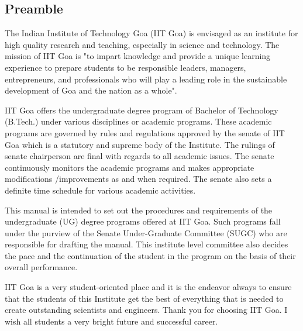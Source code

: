 \begin{center}
    \section*{Preamble }
\end{center}
The Indian Institute of Technology Goa (IIT Goa) is envisaged as an institute for high quality research and teaching, especially in science and technology. The mission of IIT Goa is "to impart knowledge and provide a unique learning experience to prepare students to be responsible leaders, managers, entrepreneurs, and professionals who will play a leading role in the sustainable development of Goa and the nation as a whole".

IIT Goa offers the undergraduate degree program of Bachelor of Technology (B.Tech.) under various disciplines or academic programs. These academic programs are governed by rules and regulations approved by the senate of IIT Goa which is a statutory and supreme body of the Institute. The rulings of senate chairperson are final with regards to all academic issues. The senate continuously monitors the academic programs and makes appropriate modifications /improvements as and when required. The senate also sets a definite time schedule for various academic activities. 

This manual is intended to set out the procedures and requirements of the undergraduate (UG) degree programs offered at IIT Goa. Such programs fall under the purview of the Senate Under-Graduate Committee (SUGC) who are responsible for drafting the manual. This institute level committee also decides the pace and the continuation of the student in the program on the basis of their overall performance.

IIT Goa is a very student-oriented place and it is the endeavor always to ensure that the students of this Institute get the best of everything that is needed to create outstanding scientists and engineers. Thank you for choosing IIT Goa. I wish all students a very bright future and successful career.